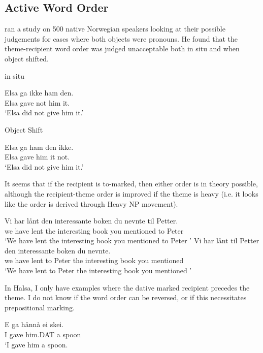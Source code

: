 \subsection{Active Word Order}
\cite{Haddican.2014} ran a study on 500 native Norwegian speakers looking at their possible judgements for cases where both objects were pronouns. He found that the theme-recipient word order was judged unacceptable both in situ and when object shifted.
\begin{exe}
\ex in situ
\begin{xlist}
\ex \gll Elsa ga ikke ham den.\\
Elsa gave not him it.\\
\trans `Elsa did not give him it.'
\end{xlist}
\ex Object Shift
\begin{xlist}
\ex \gll Elsa ga ham den ikke.\\
Elsa gave him it not.\\
\trans `Elsa did not give him it.'
\end{xlist}
\end{exe}
It seems that if the recipient is to-marked, then either order is in theory possible, although the recipient-theme order is improved if the theme is heavy (i.e. it looks like the order is derived through Heavy NP movement).
\begin{exe}
\ex
\begin{xlist}
\ex \gll Vi har lånt den interessante boken du nevnte til Petter.\\
we have lent the interesting book you mentioned to Peter\\
\trans `We have lent the interesting book you mentioned to Peter \citep{Larson.1988}'
\ex \gll Vi har lånt til Petter den interessante boken du nevnte.\\
we have lent to Peter the interesting book you mentioned\\
\trans `We have lent to Peter the interesting book you mentioned \citep{Larson.1988}'
\end{xlist}
\end{exe}
In Halsa, I only have examples where the dative marked recipient precedes the theme. I do not know if the word order can be reversed, or if this necessitates prepositional marking.
\begin{exe}
\ex \gll E ga hånnå ei skei.\\
I gave him.DAT a spoon\\
\trans `I gave him a spoon. \cite[ex 50a]{Eyorsson.2012}
\end{exe}

